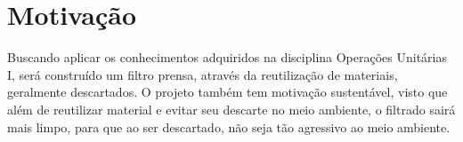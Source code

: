 \chapter{Motivação}\label{motivacao}

Buscando aplicar os conhecimentos adquiridos na disciplina Operações Unitárias
I, será construído um filtro prensa, através da reutilização de materiais,
geralmente descartados. O projeto também tem motivação sustentável, visto que
além de reutilizar material e evitar seu descarte no meio ambiente, o filtrado
sairá mais limpo, para que ao ser descartado, não seja tão agressivo ao meio
ambiente.

